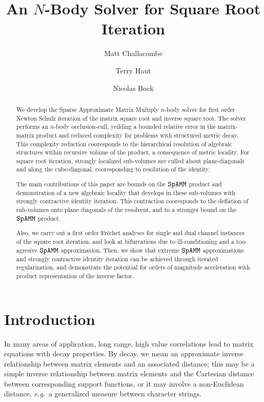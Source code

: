 \documentclass[letterpaper,twocolumn,amsmath,amsfont,amssymb,english,aps,jcp,preprintnumbers,groupaddress,nofootinbib,tightenlines,floatfix]{revtex4}
\theoremstyle{plain}
\theoremstyle{remark}
\theoremstyle{plain}
\begin{document}
\title{An $N$-Body Solver for Square Root Iteration}

\author{Matt Challacombe}

\author{Terry Haut}

\author{Nicolas Bock}



\begin{abstract}
We develop the Sparse Approximate Matrix Multiply $n$-body solver for first order Newton Schulz iteration of the 
matrix square root and inverse square root.
The solver performs an $n$-body occlusion-cull, yeilding a bounded relative error in the matrix-matrix product
and reduced complexity for problems with structured metric decay.  This complexity reduction cooresponds to 
the hierarchical resolution of algebraic structures within recursive volume of the product, a consequence of 
metric locality.  For square root iteration, strongly localized sub-volumes are  culled about 
plane-diagonals and along the cube-diagonal,  cooresponding to resolution of the identity.  

The main contributions of this paper are bounds on the $\tt SpAMM$ product and 
demonstration of a new algebraic locality that develops in these sub-volumes with strongly 
contractive identity iteration. This contraction cooresponds to the deflation of sub-volumes 
onto plane diagonals of the resolvent, and to a stronger bound on the $\tt SpAMM$ product.  

Also, we carry out a first order Fr\"{e}chet analyses for single and 
dual channel instances of the square root iteration, and look at bifurcations due to ill-conditioning and a 
too-agresive $\tt SpAMM$ approximation.  Then, we show that extreme $\tt SpAMM$ approximations and strongly contractive 
identity iteration can be achieved through iterated regularization, and demonstrate the potential for orders of magnitude 
acceleration with product representation of the inverse factor.   

\end{abstract}

\maketitle
\section{Introduction}
In many areas of application, long range, high value correlations lead to matrix equations with decay properties.
By decay, we mean an approximate inverse relationship between matrix elements and an associated distance; 
this may be a simple inverse relationship between matrix elements and the Cartesian distance between
corresponding support functions, or it may involve a non-Euclidean distance, 
{\em  e.g.}~a generalized measure between character strings. 
\end{document}
